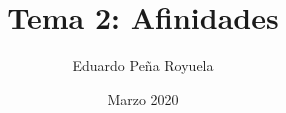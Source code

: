 \documentclass[a4paper,12pt]{article}
\title{Tema 2: Afinidades}
\author{Eduardo Peña Royuela}
\date{Marzo 2020}
\begin{document}
\maketitle



\pagebreak


\end{document}
